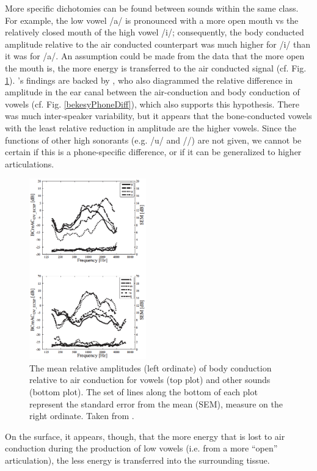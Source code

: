 \documentclass[dissertation,copyright]{uathesis}
\begin{document}
More specific dichotomies can be found between sounds within the same class. For example, the low vowel /a/ is pronounced with a more open mouth vs the relatively closed mouth of the high vowel /i/; consequently, the body conducted amplitude relative to the air conducted counterpart was much higher for /i/ than it was for /a/. An assumption could be made from the data that the more open the mouth is, the more energy is transferred to the air conducted signal (cf. Fig. \ref{BCrelACall}). \cite{reinfeldt:10}'s findings are backed by \cite{bekesy:60}, who also diagrammed the relative difference in amplitude in the ear canal between the air-conduction and body conduction of vowels (cf. Fig. \ref{bekesyPhoneDiff}), which also supports this hypothesis.  There was much inter-speaker variability, but it appears that the bone-conducted vowels with the least relative reduction in amplitude are the higher vowels.  Since the functions of other high sonorants (e.g. /u/ and //) are not given, we cannot be certain if this is a phone-specific difference, or if it can be generalized to higher articulations.  
%
\begin{figure}
\includegraphics[width=0.45\textwidth]{figure/BC_rel_AC_all.png}
\caption{The mean relative amplitudes (left ordinate) of body conduction relative to air conduction for vowels (top plot) and other sounds (bottom plot).  The set of lines along the bottom of each plot represent the standard error from the mean (SEM), measure on the right ordinate.  Taken from \cite{reinfeldt:10}.}
\label{BCrelACall}
\end{figure}
%
On the surface, it appears, though, that the more energy that is lost to air conduction during the production of low vowels (i.e. from a more ``open'' articulation), the less energy is transferred into the surrounding tissue.
\end{document}
